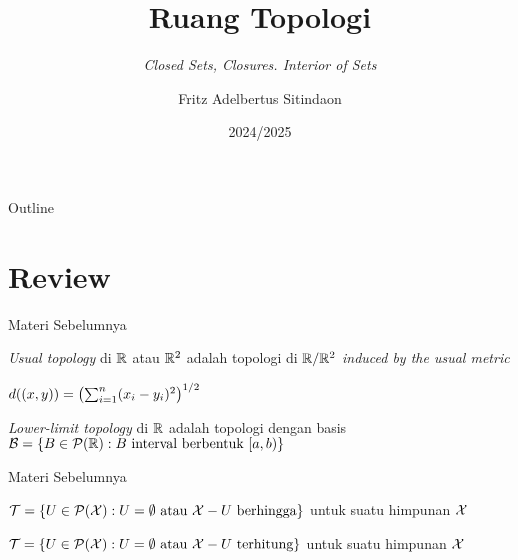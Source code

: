 \documentclass{beamer}
\title{Ruang Topologi}
\subtitle{\textit{Closed Sets, Closures. Interior of Sets}}
\date[]{2024/2025}
\author[Fritz]{Fritz Adelbertus Sitindaon}
\begin{document}
\begin{frame}
\titlepage
\end{frame}

\begin{frame}{Outline}
    \tableofcontents
\end{frame}

\section{Review}

\begin{frame}{Materi Sebelumnya}
    \begin{tcolorbox}[enhanced,title=Usual Topology, frame style tile={width=\paperwidth}{\wallpaper}]
        \textit{Usual topology} di $\R$ atau $\R^2$ adalah topologi di $\R/\R^2$ 
        \textit{induced by the usual metric}
    \end{tcolorbox}
    \begin{tcolorbox}[enhanced,title=Usual Metric di $\R^n$, frame style tile={width=\paperwidth}{\wallpaper}]
        $d((x,y)) = \oio*{\sum_{i=1}^n(x_i-y_i)^{2}}^{1/2}$
    \end{tcolorbox}
    \begin{tcolorbox}[enhanced,title=Lower-limit Topology, frame style tile={width=\paperwidth}{\wallpaper}]
        \textit{Lower-limit topology} di $\R$ adalah topologi dengan basis
        $\nB = \{B\in \nP(\R): B\text{ interval berbentuk } \cio{a,b}\}$
    \end{tcolorbox}
\end{frame}

\begin{frame}{Materi Sebelumnya}
    \begin{tcolorbox}[enhanced,title=Finite Complement Topology, frame style tile={width=\paperwidth}{\wallpaper}]
        $\nT = \{ U \in \nP(\nX): U = \emptyset \text{ atau } \nX-U \text{ berhingga}\}$ untuk suatu himpunan $\nX$
    \end{tcolorbox}
    \begin{tcolorbox}[enhanced,title=Countable Complement Topology, frame style tile={width=\paperwidth}{\wallpaper}]
        $\nT = \{ U \in \nP(\nX): U = \emptyset \text{ atau } \nX-U \text{ terhitung}\}$ untuk suatu himpunan $\nX$
    \end{tcolorbox}
\end{frame}




\end{document}
